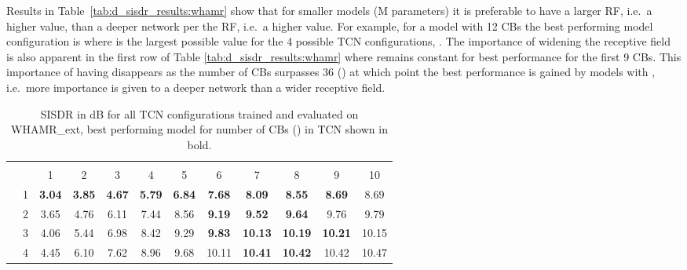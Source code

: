 \documentclass[conference,a4paper]{IEEEtran}
\begin{document}
{Results in Table~\ref{tab:d_sisdr_results:whamr}} 
show that for smaller models (M parameters)  it is preferable to have a larger \ac{RF}, i.e.{~a higher}  value, than a deeper network per the \ac{RF}, i.e.{~a higher}  value. For example, for a model with 12 \acp{CB} the best performing model configuration is  where  is the largest possible value for the 4 possible \ac{TCN} configurations, . 
The importance of widening the receptive field is also apparent in the first row of Table \ref{tab:d_sisdr_results:whamr} where  remains constant for best performance for the first 9 \acp{CB}. This importance of having  disappears as the number of \acp{CB} surpasses 36 () at which point the best performance is gained by models with , i.e.~more importance is given to a deeper network than a wider receptive field.

\begin{table}[!ht]
\setlength\tabcolsep{2.5pt}
\caption{  \ac{SISDR} 
{in dB}
for all TCN configurations trained and evaluated on WHAMR\_ext, best performing model for number of \acp{CB} () in \ac{TCN} shown in bold.}
\centering
\begin{tabular}{cc|cccccccccc|} 
\cline{3-12}
&  & \multicolumn{10}{c|}{\cellcolor[HTML]{C0C0C0}}\\ 
\cline{3-12} 
 &  & 
 \cellcolor[HTML]{C0C0C0}1 & \cellcolor[HTML]{C0C0C0}2 & \cellcolor[HTML]{C0C0C0}3 & \cellcolor[HTML]{C0C0C0}4 & \cellcolor[HTML]{C0C0C0}5 & \cellcolor[HTML]{C0C0C0}6 & \cellcolor[HTML]{C0C0C0}7 & \cellcolor[HTML]{C0C0C0}8 & \cellcolor[HTML]{C0C0C0}9 & \cellcolor[HTML]{C0C0C0}10 \\ 
 \hline
\multicolumn{1}{|c}{\cellcolor[HTML]{C0C0C0}}& \multicolumn{1}{|c|}{\cellcolor[HTML]{C0C0C0}1} & \bfseries 3.04 & \bfseries 3.85 & \bfseries 4.67 & \bfseries 5.79  & \bfseries 6.84  & \bfseries 7.68  & \bfseries 8.09  & \bfseries 8.55  & \bfseries 8.69  & 8.69  \\
\multicolumn{1}{|c}{\cellcolor[HTML]{C0C0C0}}& \multicolumn{1}{|c|}{\cellcolor[HTML]{C0C0C0}2} & 3.65 & 4.76 & 6.11 & 7.44  & 8.56  & \bfseries 9.19  & \bfseries 9.52  & \bfseries 9.64  & 9.76  & 9.79  \\
\multicolumn{1}{|c}{\cellcolor[HTML]{C0C0C0}}& \multicolumn{1}{|c|}{\cellcolor[HTML]{C0C0C0}3} & 4.06 & 5.44 & 6.98 & 8.42  & 9.29  & \bfseries 9.83  & \bfseries 10.13 & \bfseries 10.19 & \bfseries 10.21 & 10.15 \\
\multicolumn{1}{|c}{\cellcolor[HTML]{C0C0C0}}& \multicolumn{1}{|c|}{\cellcolor[HTML]{C0C0C0}4} & 4.45 & 6.10  & 7.62 & 8.96  & 9.68  & 10.11 & \bfseries 10.41 & \bfseries 10.42 & 10.42 & 10.47 \\

\end{tabular}
\end{table}
\end{document}

